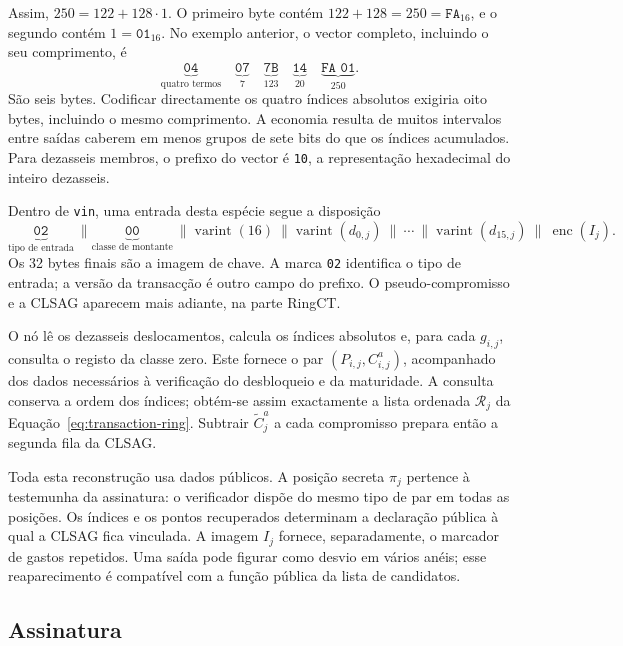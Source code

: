 Assim, \(250=122+128\cdot1\). O primeiro byte contém
\(122+128=250=\texttt{FA}_{16}\), e o segundo contém
\(1=\texttt{01}_{16}\). No exemplo anterior, o vector completo,
incluindo o seu comprimento, é
\[
 \underbrace{\texttt{04}}_{\text{quatro termos}}\quad
 \underbrace{\texttt{07}}_{7}\quad
 \underbrace{\texttt{7B}}_{123}\quad
 \underbrace{\texttt{14}}_{20}\quad
 \underbrace{\texttt{FA 01}}_{250}.
\]
São seis bytes. Codificar directamente os quatro índices absolutos
exigiria oito bytes, incluindo o mesmo comprimento. A economia resulta
de muitos intervalos entre saídas caberem em menos grupos de sete bits
do que os índices acumulados. Para dezasseis membros, o prefixo do
vector é \texttt{10}, a representação hexadecimal do inteiro dezasseis.

Dentro de \texttt{vin}, uma entrada desta espécie segue a disposição
\[
 \underbrace{\texttt{02}}_{\text{tipo de entrada}}\ \|
 \underbrace{\texttt{00}}_{\text{classe de montante}}\ \|
 \operatorname{varint}(16)\ \|
 \operatorname{varint}(d_{0,j})\ \|\ \cdots\ \|
 \operatorname{varint}(d_{15,j})\ \|\ \operatorname{enc}(I_j).
\]
Os 32 bytes finais são a imagem de chave. A marca \texttt{02} identifica
o tipo de entrada; a versão da transacção é outro campo do prefixo.
O pseudo-compromisso e a CLSAG aparecem mais adiante, na parte RingCT.

O nó lê os dezasseis deslocamentos, calcula os índices absolutos e,
para cada \(g_{i,j}\), consulta o registo da classe zero. Este fornece
o par \((P_{i,j},C^a_{i,j})\), acompanhado dos dados necessários à
verificação do desbloqueio e da maturidade. A consulta conserva a
ordem dos índices; obtém-se assim exactamente a lista ordenada
\(\mathcal R_j\) da Equação~\eqref{eq:transaction-ring}.
Subtrair \(\widetilde C^a_j\) a cada compromisso prepara então a
segunda fila da CLSAG.

Toda esta reconstrução usa dados públicos. A posição secreta
\(\pi_j\) pertence à testemunha da assinatura: o verificador dispõe
do mesmo tipo de par em todas as posições. Os índices e os pontos
recuperados determinam a declaração pública à qual a CLSAG fica
vinculada. A imagem \(I_j\) fornece, separadamente, o marcador de
gastos repetidos. Uma saída pode figurar como desvio em vários anéis;
esse reaparecimento é compatível com a função pública da lista de
candidatos.


\subsection{Assinatura}
\label{full-signature}

